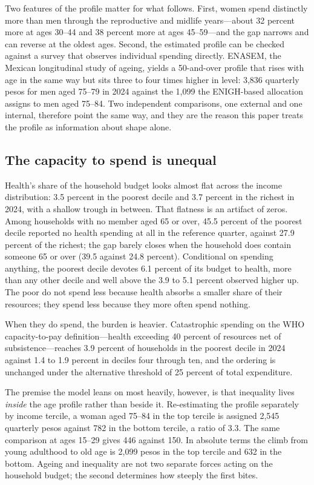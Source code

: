 Two features of the profile matter for what follows. First, women spend
distinctly more than men through the reproductive and midlife years---about 32
percent more at ages 30--44 and 38 percent more at ages 45--59---and the gap
narrows and can reverse at the oldest ages. Second, the estimated profile can be
checked against a survey that observes individual spending directly. ENASEM, the
Mexican longitudinal study of ageing, yields a 50-and-over profile that rises
with age in the same way but sits three to four times higher in level: 3{,}836
quarterly pesos for men aged 75--79 in 2024 against the 1{,}099 the ENIGH-based
allocation assigns to men aged 75--84. Two independent comparisons, one
external and one internal, therefore point the same way, and they are the reason
this paper treats the profile as information about shape alone.

\subsection{The capacity to spend is unequal}
\label{subsec:mot_inequality}

Health's share of the household budget looks almost flat across the income
distribution: 3.5 percent in the poorest decile and 3.7 percent in the richest in
2024, with a shallow trough in between. That flatness is an artifact of
zeros. Among households with no member aged 65 or over, 45.5 percent of the
poorest decile reported no health spending at all in the reference quarter,
against 27.9 percent of the richest; the gap barely closes when the household
does contain someone 65 or over (39.5 against 24.8 percent). Conditional on
spending anything, the poorest decile devotes 6.1 percent of its budget to
health, more than any other decile and well above the 3.9 to 5.1 percent
observed higher up. The poor do not spend less because health absorbs a smaller
share of their resources; they spend less because they more often spend nothing.

When they do spend, the burden is heavier. Catastrophic spending on the WHO
capacity-to-pay definition---health exceeding 40 percent of resources net of
subsistence---reaches 3.9 percent of households in the poorest decile in 2024
against 1.4 to 1.9 percent in deciles four through ten, and the ordering is
unchanged under the alternative threshold of 25 percent of total expenditure.

The premise the model leans on most heavily, however, is that inequality lives
\emph{inside} the age profile rather than beside it. Re-estimating the profile
separately by income tercile, a woman aged 75--84 in the top tercile is assigned
2{,}545 quarterly pesos against 782 in the bottom tercile, a ratio of 3.3. The
same comparison at ages 15--29 gives 446 against 150. In absolute terms the
climb from young adulthood to old age is 2{,}099 pesos in the top tercile and
632 in the bottom. Ageing and inequality are not two separate forces acting on
the household budget; the second determines how steeply the first bites.

